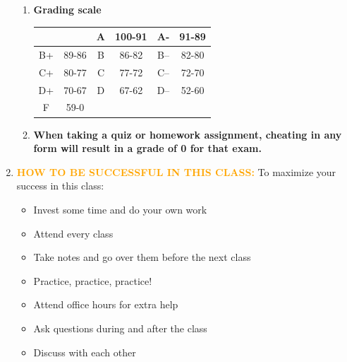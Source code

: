 \documentclass{article}
\begin{document}
\begin{enumerate}
\begin{enumerate}

\item {\bf Grading scale} 
\begin{tabular}{|c|c|c|c|c|c|}
\hline
& &A&100-91&A-&91-89\\
\hline
B+& 89-86 &B& 86-82 &B--& 82-80\\
\hline
C+& 80-77 &C& 77-72 &C--& 72-70\\
\hline
D+&70-67 &D& 67-62 &D--& 52-60\\
\hline 
F & 59-0 & & & & \\
\hline

\end{tabular}
 
\item {\bf When taking a quiz or homework assignment, cheating in any form will result in a grade of 0 for that exam.}
\end{enumerate}



\item \textcolor{orange}{\bf HOW TO BE SUCCESSFUL IN THIS CLASS:} 
  To maximize your success in this class:
\begin{itemize}
\item Invest some time and do your own work
\item Attend every class 
\item Take notes and go over them before the next class
\item Practice, practice, practice! 
\item Attend office hours for extra help
\item Ask questions during and after the class
\item Discuss with each other
\end{itemize}



\end{enumerate}
\end{document}
